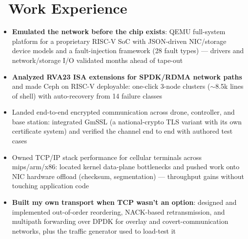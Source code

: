 \documentclass{resume}
\begin{document}
\section{\faBriefcase\ Work Experience}
\begin{singlespacing}
\begin{itemize}
	\item \textbf{Emulated the network before the chip exists}: QEMU full-system platform for a proprietary RISC-V SoC with JSON-driven NIC/storage device models and a fault-injection framework (28 fault types) --- drivers and network/storage I/O validated months ahead of tape-out
	\item \textbf{Analyzed RVA23 ISA extensions for SPDK/RDMA network paths} and made Ceph on RISC-V deployable: one-click 3-node clusters ($\sim$8.5k lines of shell) with auto-recovery from 14 failure classes
\end{itemize}
\end{singlespacing}

\begin{singlespacing}
\begin{itemize}
	\item Landed end-to-end encrypted communication across drone, controller, and base station: integrated GmSSL (a national-crypto TLS variant with its own certificate system) and verified the channel end to end with authored test cases
\end{itemize}
\end{singlespacing}

\begin{singlespacing}
\begin{itemize}
	\item Owned TCP/IP stack performance for cellular terminals across mips/arm/x86: located kernel data-plane bottlenecks and pushed work onto NIC hardware offload (checksum, segmentation) --- throughput gains without touching application code
\end{itemize}
\end{singlespacing}

\begin{singlespacing}
\begin{itemize}
	\item \textbf{Built my own transport when TCP wasn't an option}: designed and implemented out-of-order reordering, NACK-based retransmission, and multipath forwarding over DPDK for overlay and covert-communication networks, plus the traffic generator used to load-test it
\end{itemize}
\end{singlespacing}
\end{document}
